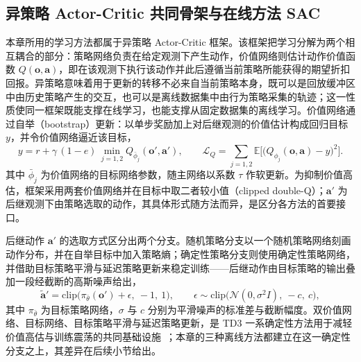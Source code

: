 \subsection{异策略 Actor-Critic 共同骨架与在线方法 SAC}\label{subsec:ch5_method_sac}

本章所用的学习方法都属于异策略 Actor-Critic 框架。该框架把学习分解为两个相互耦合的部分：策略网络负责在给定观测下产生动作，价值网络则估计动作价值函数 $Q(\mathbf{o},\mathbf{a})$，即在该观测下执行该动作并此后遵循当前策略所能获得的期望折扣回报。异策略意味着用于更新的转移不必来自当前策略本身，既可以是回放缓冲区中由历史策略产生的交互，也可以是离线数据集中由行为策略采集的轨迹；这一性质使同一框架既能支撑在线学习，也能支撑从固定数据集的离线学习。价值网络通过自举（bootstrap）更新：以单步奖励加上对后继观测的价值估计构成回归目标 $y$，并令价值网络逼近该目标，
\begin{equation}
y = r + \gamma\,(1-e)\,\min_{j=1,2} Q_{\bar\phi_j}(\mathbf{o}',\mathbf{a}'),
\qquad
\mathcal{L}_{Q} = \sum_{j=1,2}\mathbb{E}\big[\big(Q_{\phi_j}(\mathbf{o},\mathbf{a}) - y\big)^2\big].
\label{eq:ch5_critic_target}
\end{equation}
其中 $\bar\phi_j$ 为价值网络的目标网络参数，随主网络以系数 $\tau$ 作软更新。为抑制价值高估，框架采用两套价值网络并在目标中取二者较小值（clipped double-Q）；$\mathbf{a}'$ 为后继观测下由策略选取的动作，其具体形式随方法而异，是区分各方法的首要接口。

后继动作 $\mathbf{a}'$ 的选取方式区分出两个分支。随机策略分支以一个随机策略网络刻画动作分布，并在自举目标中加入策略熵；确定性策略分支则使用确定性策略网络，并借助目标策略平滑与延迟策略更新来稳定训练——后继动作由目标策略的输出叠加一段经截断的高斯噪声给出，
\begin{equation}
\tilde{\mathbf{a}}' = \mathrm{clip}\big(\pi_{\bar\theta}(\mathbf{o}') + \epsilon,\ -1,\ 1\big),
\qquad
\epsilon \sim \mathrm{clip}\big(\mathcal{N}(0,\sigma^2 I),\ -c,\ c\big),
\label{eq:ch5_target_smoothing}
\end{equation}
其中 $\pi_{\bar\theta}$ 为目标策略网络，$\sigma$ 与 $c$ 分别为平滑噪声的标准差与截断幅度。双价值网络、目标网络、目标策略平滑与延迟策略更新，是 TD3 一系确定性方法用于减轻价值高估与训练震荡的共同基础设施~\citep{fujimoto2018td3}；本章的三种离线方法都建立在这一确定性分支之上，其差异在后续小节给出。

